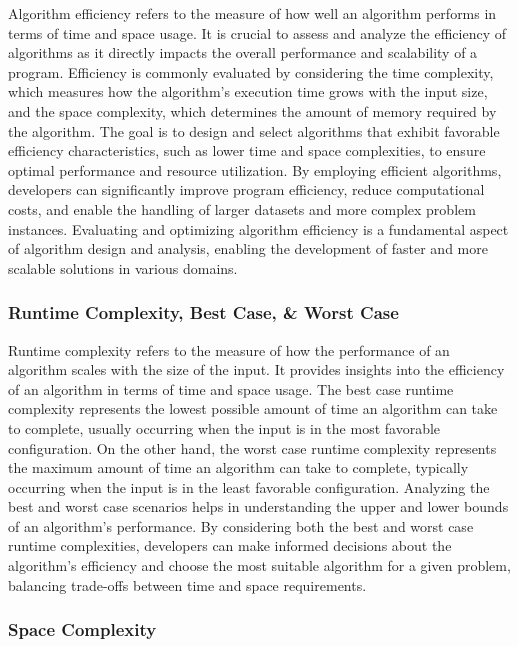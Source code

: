 Algorithm efficiency refers to the measure of how well an algorithm performs in terms of time and space usage. It is crucial to assess and analyze the efficiency of algorithms as it directly impacts the overall performance and scalability of a program. Efficiency is commonly evaluated by considering the time complexity, which measures how the algorithm's execution time grows with the input size, and the space complexity, 
which determines the amount of memory required by the algorithm. The goal is to design and select algorithms that exhibit favorable efficiency characteristics, such as lower time and space complexities, to ensure optimal performance and resource utilization. By employing efficient algorithms, developers can significantly improve program efficiency, reduce computational costs, and enable the handling of larger datasets and 
more complex problem instances. Evaluating and optimizing algorithm efficiency is a fundamental aspect of algorithm design and analysis, enabling the development of faster and more scalable solutions in various domains. \\

\subsubsection*{Runtime Complexity, Best Case, \& Worst Case}

Runtime complexity refers to the measure of how the performance of an algorithm scales with the size of the input. It provides insights into the efficiency of an algorithm in terms of time and space usage. The best case runtime complexity represents the lowest possible amount of time an algorithm can take to complete, usually occurring when the input is in the most favorable configuration. On the other hand, the worst case 
runtime complexity represents the maximum amount of time an algorithm can take to complete, typically occurring when the input is in the least favorable configuration. Analyzing the best and worst case scenarios helps in understanding the upper and lower bounds of an algorithm's performance. By considering both the best and worst case runtime complexities, developers can make informed decisions about the algorithm's efficiency 
and choose the most suitable algorithm for a given problem, balancing trade-offs between time and space requirements. \\

\subsubsection*{Space Complexity}

